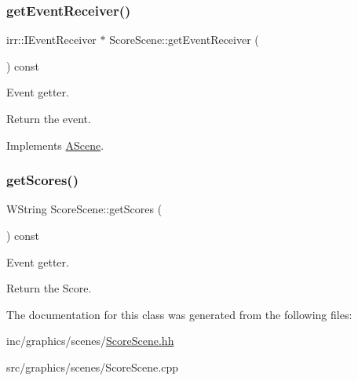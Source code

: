 \subsubsection{\texorpdfstring{get\+Event\+Receiver()}{getEventReceiver()}}
{\footnotesize\ttfamily irr\+::\+I\+Event\+Receiver $\ast$ Score\+Scene\+::get\+Event\+Receiver (\begin{DoxyParamCaption}{ }\end{DoxyParamCaption}) const\hspace{0.3cm}{\ttfamily [virtual]}}



Event getter. 

Return the event. 

Implements \hyperlink{classAScene_af521e5e6d30a5d2e5d30eb333e4d3abd}{A\+Scene}.

\mbox{\label{classScoreScene_af82d6c841dc42c42d83202d2c7ddf8c9}} 
\subsubsection{\texorpdfstring{get\+Scores()}{getScores()}}
{\footnotesize\ttfamily W\+String Score\+Scene\+::get\+Scores (\begin{DoxyParamCaption}{ }\end{DoxyParamCaption}) const}



Event getter. 

Return the Score. 

The documentation for this class was generated from the following files\+:\begin{DoxyCompactItemize}
\item 
inc/graphics/scenes/\hyperlink{ScoreScene_8hh}{Score\+Scene.\+hh}\item 
src/graphics/scenes/Score\+Scene.\+cpp\end{DoxyCompactItemize}
